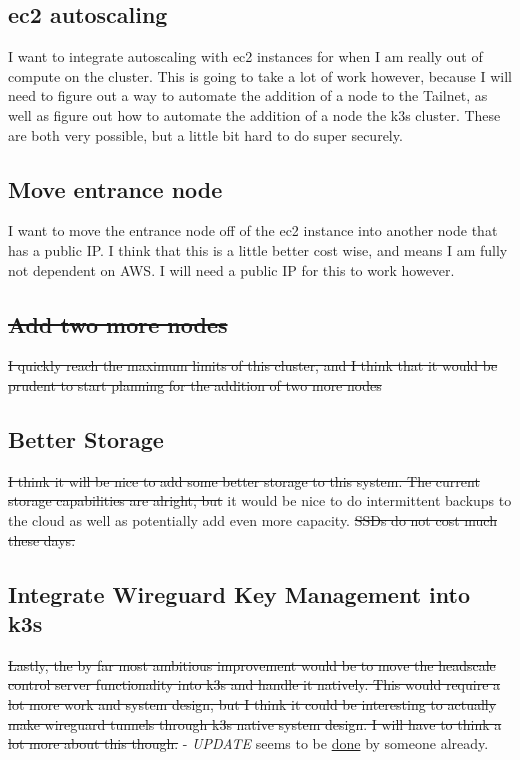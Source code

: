 \documentclass[12pt]{article}
\begin{document}
\subsection{ec2 autoscaling}
I want to integrate autoscaling with ec2 instances for when I am really out of compute on the cluster. This is going to take a lot of work however, because I will need to figure out a way to automate the addition of a node to the Tailnet, as well as figure out how to automate the addition of a node the k3s cluster. These are both very possible, but a little bit hard to do super securely.

\subsection{Move entrance node}
I want to move the entrance node off of the ec2 instance into another node that has a public IP. I think that this is a little better cost wise, and means I am fully not dependent on AWS. I will need a public IP for this to work however.

\subsection{\sout{Add two more nodes}}
\sout{I quickly reach the maximum limits of this cluster, and I think that it would be prudent to start planning for the addition of two more nodes}

\subsection{Better Storage}
\sout{I think it will be nice to add some better storage to this system. The current storage capabilities are alright, but }it would be nice to do intermittent backups to the cloud as well as potentially add even more capacity. \sout{SSDs do not cost much these days.}

\subsection{Integrate Wireguard Key Management into k3s}
\sout{Lastly, the by far most ambitious improvement would be to move the headscale control server functionality into k3s and handle it natively. This would require a lot more work and system design, but I think it could be interesting to actually make wireguard tunnels through k3s native system design. I will have to think a lot more about this though.} - \emph{UPDATE} seems to be \href{https://www.netmaker.org/blog/deploy-distributed-kubernetes-clusters-with-wireguard-and-netmaker}{done} by someone already.
\end{document}
